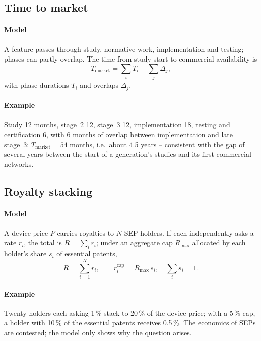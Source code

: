 \documentclass[11pt,a4paper]{article}
\begin{document}
\subsection{Time to market}\label{sec:ttm}
\paragraph{Model} A feature passes through study, normative work, implementation and testing; phases can partly
overlap. The time from study start to commercial availability is
\begin{equation}\label{eq:ttm}
  T_{\mathrm{market}} = \sum_{i} T_i - \sum_{j} \Delta_j ,
\end{equation}
with phase durations $T_i$ and overlaps $\Delta_j$.
\paragraph{Example} Study 12 months, stage~2 12, stage~3 12, implementation 18, testing and certification 6, with 6
months of overlap between implementation and late stage~3: $T_{\mathrm{market}} = 54$ months, i.e.\ about 4.5 years
-- consistent with the gap of several years between the start of a generation's studies and its first commercial
networks.

\subsection{Royalty stacking}\label{sec:stack}
\paragraph{Model} A device price $P$ carries royalties to $N$ SEP holders. If each independently asks a rate $r_i$, the
total is $R = \sum_i r_i$; under an aggregate cap $R_{\max}$ allocated by each holder's share $s_i$ of essential patents,
\begin{equation}\label{eq:stack}
  R = \sum_{i=1}^{N} r_i, \qquad r_i^{\mathrm{cap}} = R_{\max}\, s_i, \quad \sum_i s_i = 1 .
\end{equation}
\paragraph{Example} Twenty holders each asking 1\,\% stack to 20\,\% of the device price; with a 5\,\% cap, a holder with
10\,\% of the essential patents receives 0.5\,\%. The economics of SEPs are contested; the model only shows why the
question arises.
\end{document}
